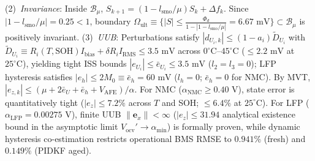 \documentclass[preprint,12pt]{elsarticle}
\begin{document}
(2)~\emph{Invariance}: Inside $\mathcal{B}_\mu$, $S_{k+1} = (1 - l_{\text{smo}}/\mu)S_k + \Delta f_k$. Since $|1 - l_{\text{smo}}/\mu| = 0.25 < 1$, boundary $\Omega_{\text{ult}} \equiv \{|S| \le \frac{\Phi_d}{1 - |1 - l_{\text{smo}}/\mu|} = 6.67\text{ mV}\} \subset \mathcal{B}_\mu$ is positively invariant. 
(3)~\emph{UUB}: Perturbations satisfy $|d_{U_i,k}| \le (1 - a_i)\tilde{D}_{U_i}$ with $\tilde{D}_{U_i} \equiv R_i(T,\text{SOH}) I_{\text{bias}} + \delta R_i I_{\text{RMS}} \le 3.5\text{ mV}$ across $0^\circ\text{C}\text{--}45^\circ\text{C}$ ($\le 2.2\text{ mV}$ at $25^\circ\text{C}$), yielding tight ISS bounds $|e_{U_i}| \le \bar{e}_{U_i} \le 3.5\text{ mV}$ ($l_2=l_3=0$); LFP hysteresis satisfies $|e_h| \le 2 M_0 \equiv \bar{e}_h = 60\text{ mV}$ ($l_h=0$; $\bar{e}_h = 0$ for NMC). By MVT, $|e_{z,k}| \le (\mu + 2\bar{e}_{U} + \bar{e}_h + V_{\text{AFE}})/\alpha$. For NMC ($\alpha_{\text{NMC}} \ge 0.40\text{ V}$), state error is quantitatively tight ($|e_z| \le 7.2\%$ across $T$ and SOH; $\le 6.4\%$ at $25^\circ\text{C}$). For LFP ($\alpha_{\text{LFP}} = 0.00275\text{ V}$), finite UUB $\|\mathbf{e}_x\| < \infty$ ($|e_z| \le 31.94$ analytical existence bound in the asymptotic limit $V_{\text{ocv}}' \to \alpha_{\min}$) is formally proven, while dynamic hysteresis co-estimation restricts operational BMS RMSE to $0.941\%$ (fresh) and $0.149\%$ (PIDKF aged). 
\end{document}
